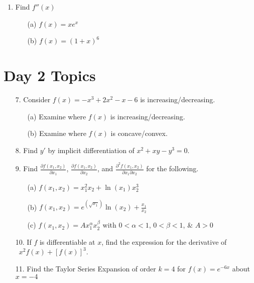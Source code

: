 \documentclass[11pt]{article}
\begin{document}
\begin{enumerate}
\item Find \( f''(x) \)

\begin{itemize}
    \item[(a)] \( f(x) = xe^{x} \)
    \item[(b)] \( f(x) = (1 + x)^{6} \)
\end{itemize}

\end{enumerate}

\newpage
\section*{Day 2 Topics}

\begin{enumerate} 

\item[7.] Consider \( f(x) = -x^3 + 2x^2 - x - 6 \) is increasing/decreasing.

\begin{itemize}
    \item[(a)] Examine where \( f(x) \) is increasing/decreasing.
    \item[(b)] Examine where \( f(x) \) is concave/convex.
\end{itemize}
   
\item[8.] Find \( y' \) by implicit differentiation of \( x^2 + xy - y^3 = 0 \).

\item[9.] Find \( \frac{\partial f(x_1, x_2)}{\partial x_1} \), \( \frac{\partial f(x_1, x_2)}{\partial x_2} \), and \( \frac{\partial^2 f(x_1, x_2)}{\partial x_1 \partial x_2} \) for the following.

\begin{itemize}
    \item[(a)] \( f(x_1, x_2) = x_1^2 x_2 + \ln(x_1) x_2^3 \)
    \item[(b)] \( f(x_1, x_2) = e^{(\sqrt{x_1})} \ln(x_2) + \frac{x_1}{x_2} \)
    \item[(c)] \( f(x_1, x_2) = Ax_1^{\alpha}x_2^{\beta} \) with \( 0 < \alpha < 1 \), \( 0 < \beta < 1 \), \& \( A > 0 \)
\end{itemize}

\item[10.] If \( f \) is differentiable at \( x \), find the expression for the derivative of \\\ \( x^2 f(x) + [f(x)]^3 \).

\item[11.] Find the Taylor Series Expansion of order \( k = 4 \) for \(f(x) = e^{-6x} \) about \( x = -4 \)

\end{enumerate}
\end{document}
